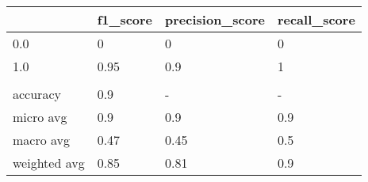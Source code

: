 \begin{tabular}{llll}
\toprule
{} & f1\_score & precision\_score & recall\_score \\
\midrule
0.0          &        0 &               0 &            0 \\
1.0          &     0.95 &             0.9 &            1 \\
             &          &                 &              \\
accuracy     &      0.9 &               - &            - \\
micro avg    &      0.9 &             0.9 &          0.9 \\
macro avg    &     0.47 &            0.45 &          0.5 \\
weighted avg &     0.85 &            0.81 &          0.9 \\
\bottomrule
\end{tabular}
